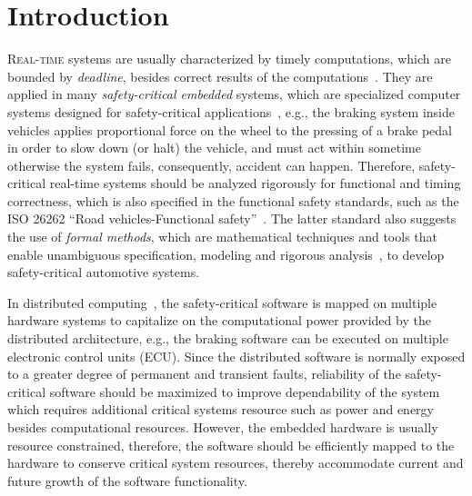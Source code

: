 \chapter{Introduction}\label{chapter_introduction}
\lettrine{R}{eal-time} systems are usually characterized by timely computations, which are bounded by \textit{deadline}, besides correct results of the computations~\cite{Buttazzo2003}. They are applied in many \textit{safety-critical embedded} systems, which are specialized computer systems designed for safety-critical applications~\cite{WangJiacun2017RES}, e.g., the braking system inside vehicles applies proportional force on the wheel to the pressing of a brake pedal in order to slow down (or halt) the vehicle, and must act within sometime otherwise the system fails, consequently, accident can happen. Therefore, safety-critical real-time systems should be analyzed rigorously for functional and timing correctness, which is also specified in the functional safety standards, such as the ISO 26262 ``Road vehicles-Functional safety''~\cite{iso201126262}. The latter standard also suggests the use of \textit{formal methods}, which are mathematical techniques and tools that enable unambiguous specification, modeling and rigorous analysis~\cite{o2017concise}, to develop safety-critical automotive systems.

In distributed computing~\cite{Kopetz2003Real-timeApplications}, the safety-critical software is mapped on multiple hardware systems to capitalize on the computational power provided by the distributed architecture, e.g., the braking software can be executed on multiple electronic control units (ECU). Since the distributed software is  normally exposed to a greater degree of permanent and transient faults, reliability of the safety-critical software should be maximized to improve dependability of the  system which requires additional critical systems resource such as power and energy besides computational resources. However, the embedded hardware is usually resource constrained, therefore, the software should be efficiently mapped to the hardware to conserve critical system resources, thereby accommodate current and future growth of the software functionality.

